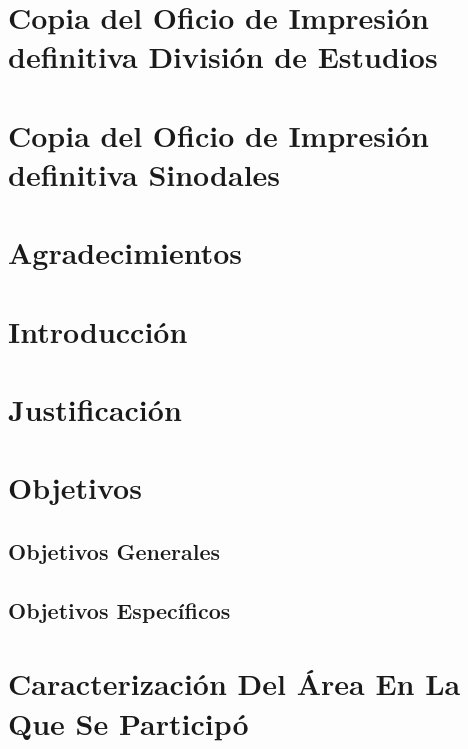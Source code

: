 \documentclass[a4paper,12pt, listof=totoc]{report}
\author{
  Fernando Garcia Corona\\
  \texttt{https://github.com/FerCorona/crown}
}
\begin{document}
	
	
	
	\chapter* {Copia del Oficio de Impresión definitiva División de Estudios }
	
	\chapter* {Copia del Oficio de Impresión definitiva Sinodales}
	
	\chapter* {Agradecimientos }
	
	\tableofcontents
		
		\listoffigures
		
		\chapter {Introducción}
			
			
		\chapter {Justificación }
			
		
		\chapter {Objetivos }
			\section {Objetivos Generales}
				
			
			\section {Objetivos Específicos} 
				
		
		\chapter {Caracterización Del Área En La Que Se Participó  }
			
		
\end{document}
